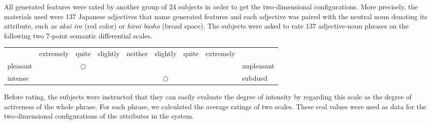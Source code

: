 All generated features were rated by another group of 24 subjects 
in order to get the two-dimensional configurations.
More precisely, the materials used were 137 Japanese adjectives that name
generated features and each adjective was paired with the neutral noun
denoting its attribute, such as {\it akai iro} (red color) or 
{\it hiroi basho} (broad space).
The subjects were asked to rate 137 adjective-noun phrases on 
the following two 7-point semantic differential scales.
\begin{center}
  \footnotesize
  \begin{tabular}{l|p{5mm}|p{5mm}|p{5mm}|p{5mm}|p{5mm}|p{5mm}|p{5mm}|l}
    \multicolumn{1}{c}{} & \multicolumn{1}{c}{extremely} & \multicolumn{1}{c}{quite} & \multicolumn{1}{c}{slightly} & \multicolumn{1}{c}{neither} & \multicolumn{1}{c}{slightly} & \multicolumn{1}{c}{quite} & \multicolumn{1}{c}{extremely} & \\ \cline{2-8}
    pleasant & & \multicolumn{1}{c|}{$\bigcirc$} & & & & & & unpleasant \\ \cline{2-8}
    intense & & & & & \multicolumn{1}{c|}{$\bigcirc$} & & & subdued \\ \cline{2-8}
  \end{tabular}
  \vspace*{.5\baselineskip}
\end{center}
Before rating, the subjects were instructed that they can easily evaluate the
degree of intensity by regarding this scale as the degree of activeness of the whole phrase.
For each phrase, we calculated the average ratings of two scales.
These real values were used as data for the two-dimensional
configurations of the attributes in the \SNAME\/ system.

